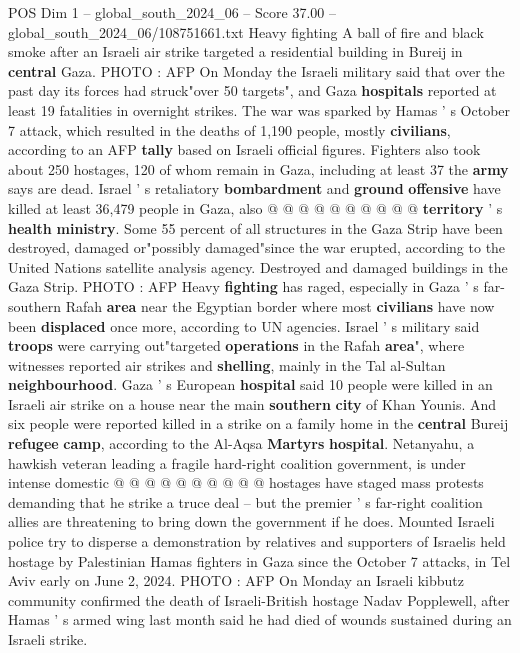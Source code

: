 \begin{textsample}{POS Dim 1 – global\_south\_2024\_06 – Score 37.00 – global\_south\_2024\_06/108751661.txt}
Heavy fighting A ball of fire and black smoke after an Israeli air strike targeted a residential building in Bureij in \textbf{central} Gaza.
PHOTO : AFP On Monday the Israeli military said that over the past day its forces had struck"over 50 targets", and Gaza \textbf{hospitals} reported at least 19 fatalities in overnight strikes.
The war was sparked by Hamas ' s October 7 attack, which resulted in the deaths of 1,190 people, mostly \textbf{civilians}, according to an AFP \textbf{tally} based on Israeli official figures.
Fighters also took about 250 hostages, 120 of whom remain in Gaza, including at least 37 the \textbf{army} says are dead.
Israel ' s retaliatory \textbf{bombardment} and \textbf{ground} \textbf{offensive} have killed at least 36,479 people in Gaza, also @ @ @ @ @ @ @ @ @ @ \textbf{territory} ' s \textbf{health} \textbf{ministry}.
Some 55 percent of all structures in the Gaza Strip have been destroyed, damaged or"possibly damaged"since the war erupted, according to the United Nations satellite analysis agency.
Destroyed and damaged buildings in the Gaza Strip.
PHOTO : AFP Heavy \textbf{fighting} has raged, especially in Gaza ' s far-southern Rafah \textbf{area} near the Egyptian border where most \textbf{civilians} have now been \textbf{displaced} once more, according to UN agencies.
Israel ' s military said \textbf{troops} were carrying out"targeted \textbf{operations} in the Rafah \textbf{area}", where witnesses reported air strikes and \textbf{shelling}, mainly in the Tal al-Sultan \textbf{neighbourhood}.
Gaza ' s European \textbf{hospital} said 10 people were killed in an Israeli air strike on a house near the main \textbf{southern} \textbf{city} of Khan Younis.
And six people were reported killed in a strike on a family home in the \textbf{central} Bureij \textbf{refugee} \textbf{camp}, according to the Al-Aqsa \textbf{Martyrs} \textbf{hospital}.
Netanyahu, a hawkish veteran leading a fragile hard-right coalition government, is under intense domestic @ @ @ @ @ @ @ @ @ @ hostages have staged mass protests demanding that he strike a truce deal -- but the premier ' s far-right coalition allies are threatening to bring down the government if he does.
Mounted Israeli police try to disperse a demonstration by relatives and supporters of Israelis held hostage by Palestinian Hamas fighters in Gaza since the October 7 attacks, in Tel Aviv early on June 2, 2024.
PHOTO : AFP On Monday an Israeli kibbutz community confirmed the death of Israeli-British hostage Nadav Popplewell, after Hamas ' s armed wing last month said he had died of wounds sustained during an Israeli strike.

\end{textsample}
